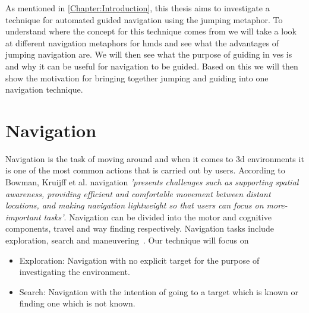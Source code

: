 \label{Chapter:Related Work}
As mentioned in \cref{Chapter:Introduction}, this thesis aims to investigate a technique for automated guided navigation using the jumping metaphor. To understand where the concept for this technique comes from we will take a look at different navigation metaphors for \acrshort{hmd}s and see what the advantages of jumping navigation are. We will then see what the purpose of guiding in \acrshort{ve}s is and why it can be useful for navigation to be guided. Based on this we will then show the motivation for bringing together jumping and guiding into one navigation technique. 

\section{Navigation}
\label{section RW: Navigation}

Navigation is the task of moving around and when it comes to \acrfull{3d} environments it is one of the most common actions that is carried out by users. According to Bowman, Kruijff et al. navigation \textit{'presents challenges such as supporting spatial awareness, providing efficient and comfortable movement between distant locations, and making navigation lightweight so that users can focus on more-important tasks'}. Navigation can be divided into the motor and cognitive components, travel and way finding respectively. Navigation tasks include exploration, search and maneuvering~\cite{Bowman2001}. Our technique will focus on 
\begin{itemize}
	\item Exploration: Navigation with no explicit target for the purpose of investigating the environment.
	\item Search: Navigation with the intention of going to a target which is known or finding one which is not known.
\end{itemize}

